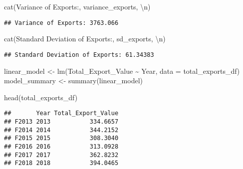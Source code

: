 \documentclass[
]{article}
\newenvironment{Shaded}{\begin{snugshade}}{\end{snugshade}}
\newcommand{\AttributeTok}[1]{\textcolor[rgb]{0.77,0.63,0.00}{#1}}
\newcommand{\FunctionTok}[1]{\textcolor[rgb]{0.00,0.00,0.00}{#1}}
\newcommand{\NormalTok}[1]{#1}
\newcommand{\OtherTok}[1]{\textcolor[rgb]{0.56,0.35,0.01}{#1}}
\newcommand{\SpecialCharTok}[1]{\textcolor[rgb]{0.00,0.00,0.00}{#1}}
\newcommand{\StringTok}[1]{\textcolor[rgb]{0.31,0.60,0.02}{#1}}
\begin{document}
\begin{Shaded}
\begin{Highlighting}[]
\FunctionTok{cat}\NormalTok{(}\StringTok{\textquotesingle{}Variance of Exports:\textquotesingle{}}\NormalTok{, variance\_exports, }\StringTok{\textquotesingle{}}\SpecialCharTok{\textbackslash{}n}\StringTok{\textquotesingle{}}\NormalTok{)}
\end{Highlighting}
\end{Shaded}

\begin{verbatim}
## Variance of Exports: 3763.066
\end{verbatim}

\begin{Shaded}
\begin{Highlighting}[]
\FunctionTok{cat}\NormalTok{(}\StringTok{\textquotesingle{}Standard Deviation of Exports:\textquotesingle{}}\NormalTok{, sd\_exports, }\StringTok{\textquotesingle{}}\SpecialCharTok{\textbackslash{}n}\StringTok{\textquotesingle{}}\NormalTok{)}
\end{Highlighting}
\end{Shaded}

\begin{verbatim}
## Standard Deviation of Exports: 61.34383
\end{verbatim}

\begin{Shaded}
\begin{Highlighting}[]
\NormalTok{linear\_model }\OtherTok{\textless{}{-}} \FunctionTok{lm}\NormalTok{(Total\_Export\_Value }\SpecialCharTok{\textasciitilde{}}\NormalTok{ Year, }\AttributeTok{data =}\NormalTok{ total\_exports\_df)}
\NormalTok{model\_summary }\OtherTok{\textless{}{-}} \FunctionTok{summary}\NormalTok{(linear\_model)}
\end{Highlighting}
\end{Shaded}

\begin{Shaded}
\begin{Highlighting}[]
\FunctionTok{head}\NormalTok{(total\_exports\_df)}
\end{Highlighting}
\end{Shaded}

\begin{verbatim}
##       Year Total_Export_Value
## F2013 2013           334.6657
## F2014 2014           344.2152
## F2015 2015           308.3040
## F2016 2016           313.0928
## F2017 2017           362.8232
## F2018 2018           394.0465
\end{verbatim}
\end{document}
